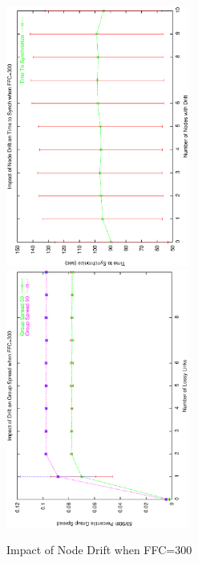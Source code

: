 \begin{figure}
\centerline{%
\includegraphics[width=6cm,angle=270]{figures/TTSvsDriftFFC300.ps}
\includegraphics[width=6cm,angle=270]{figures/GSvsDriftFFC300.ps}
}
\caption{Impact of Node Drift when FFC=300}
\label{fig:drift300}
\end{figure}


